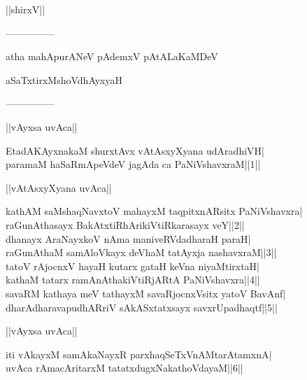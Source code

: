 \documentclass{article}
\begin{document}
\begin{center}
||shirxV||
\end{center}

\begin{center}
---------------
\end{center}

\begin{center}
atha mahApurANeV pAdemxV pAtALaKaMDeV
\end{center}

\begin{center}
aSaTxtirxMshoVdhAyxyaH
\end{center}

\begin{center}
---------------
\end{center}

\begin{center}
||vAyxsa uvAca||
\end{center}

EtadAKAyxnakaM shurxtAvx vAtAsxyXyana udAradhiVH|\\
paramaM haSaRmApeVdeV jagAda ca PaNiVshavxraM||1||\\

\begin{center}
||vAtAsxyXyana uvAca||
\end{center}

kathAM saMshaqNavxtoV mahayxM taqpitxnARsitx PaNiVshavxra|\\
raGunAthasayx BakAtxtiRhArikiVtiRkarasayx veY||2||\\
dhanayx AraNayxkoV nAma maniveRVdadharaH paraH|\\
raGunAthaM samAloVkayx deVhaM tatAyxja nashavxraM||3||\\
tatoV rAjocnxV hayaH kutarx gataH keVna niyaMtirxtaH|\\
kathaM tatarx ramAnAthakiVtiRjARtA PaNiVshavxra||4||\\
savaRM kathaya meV tathayxM savaRjocnxVsitx yatoV BavAnf|\\
dharAdharavapudhARriV sAkASxtatxsayx savxrUpadhaqtf||5||\\

\begin{center}
||vAyxsa uvAca||
\end{center}

iti vAkayxM samAkaNayxR parxhaqSeTxVnAMtarAtamxnA|\\
uvAca rAmacAritarxM tatatxdugxNakathoVdayaM||6||\\
\end{document}
